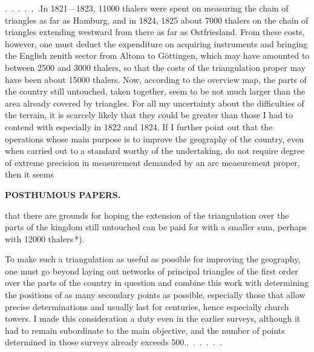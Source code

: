 \par\noindent\hspace*{\parindent}\mbox{.\ .\ .\ .\ .\ .}\quad In 1821---1823, 11000 thalers were spent on measuring the chain of
triangles as far as Hamburg, and in 1824, 1825 about 7000 thalers on the chain
of triangles extending westward from there as far as Ostfriesland. From these
costs, however, one must deduct the expenditure on acquiring instruments and
bringing the English zenith sector from Altona to Göttingen, which may have
amounted to between 2500 and 3000 thalers, so that the costs of the triangulation
proper may have been about 15000 thalers. Now, according to the overview map,
the parts of the country still untouched, taken together, seem to be not much
larger than the area already covered by triangles. For all my uncertainty about
the difficulties of the terrain, it is scarcely likely that they could be
greater than those I had to contend with especially in 1822 and 1824. If I
further point out that the operations whose main purpose is to improve the
geography of the country, even when carried out to a standard worthy of the
undertaking, do not require  degree of extreme precision in
measurement demanded by an arc measurement proper, then it seems
\par\clearpage
\noindent{}\hfill{\small\textbf{POSTHUMOUS PAPERS.}}\hfill\null\par\medskip
\noindent that there are grounds for hoping the extension of the triangulation
over the parts of the kingdom still untouched can be paid for with a smaller
sum, perhaps with 12000 thalers\,*).

To make such a triangulation as useful as possible for improving the geography,
one must go beyond laying out networks of principal triangles of the first
order over the parts of the country in question and combine this work with
determining the positions of as many secondary points as possible, especially
those that allow precise determinations and usually last for centuries, hence
especially church towers. I made this consideration a duty even in the earlier
surveys, although it had to remain subordinate to the main objective, and the
number of points determined in those surveys already exceeds 500.\quad\mbox{.\ .\ .\ .\ .\ .}

